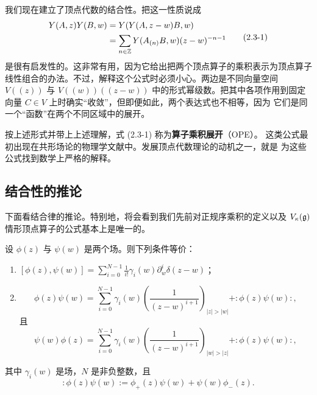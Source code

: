 我们现在建立了顶点代数的结合性。把这一性质说成
\begin{equation}
    \begin{aligned}
        Y(A,z)Y(B,w)
        &=Y(Y(A,z-w)B,w)\\
        &=\sum_{n\in\mathbb{Z}}Y(A_{(n)}B,w)(z-w)^{-n-1}
    \end{aligned}
    \tag{2.3-1}
\end{equation}
是很有启发性的。这非常有用，因为它给出把两个顶点算子的乘积表示为顶点算子
线性组合的办法。不过，解释这个公式时必须小心。两边是不同向量空间
$V(\!(z)\!)$ 与 $V(\!(w)\!)(\!(z-w)\!)$ 中的形式幂级数。把其中各项作用到固定
向量 $C\in V$ 上时确实“收敛”，但即便如此，两个表达式也不相等，因为
它们是同一个“函数”在两个不同区域中的展开。

按上述形式并带上上述理解，式 (2.3-1) 称为\textbf{算子乘积展开}（OPE）。
这类公式最初出现在共形场论的物理学文献中。发展顶点代数理论的动机之一，就是
为这些公式找到数学上严格的解释。

\subsection{结合性的推论}

下面看结合律的推论。特别地，将会看到我们先前对正规序乘积的定义以及
$V_\kappa(\mathfrak{g})$ 情形顶点算子的公式基本上是唯一的。

\renewcommand{\thelemma}{2.3.4}
\begin{lemma}
    设 $\phi(z)$ 与 $\psi(w)$ 是两个场。则下列条件等价：
    \begin{enumerate}[label=(\arabic*)]
        \item $[\phi(z),\psi(w)]=\sum_{i=0}^{N-1}\frac{1}{i!}
        \gamma_i(w)\partial_w^i\delta(z-w)$；
        \item
        \[
            \phi(z)\psi(w)=\sum_{i=0}^{N-1}\gamma_i(w)
            \left(\frac{1}{(z-w)^{i+1}}\right)_{|z|>|w|}
            +:\!\phi(z)\psi(w)\!:,
        \]
        且
        \[
            \psi(w)\phi(z)=\sum_{i=0}^{N-1}\gamma_i(w)
            \left(\frac{1}{(z-w)^{i+1}}\right)_{|w|>|z|}
            +:\!\phi(z)\psi(w)\!:,
        \]
    \end{enumerate}
    其中 $\gamma_i(w)$ 是场，$N$ 是非负整数，且
    \[
        :\!\phi(z)\psi(w)\!:=\phi_+(z)\psi(w)+\psi(w)\phi_-(z).
    \]
\end{lemma}

